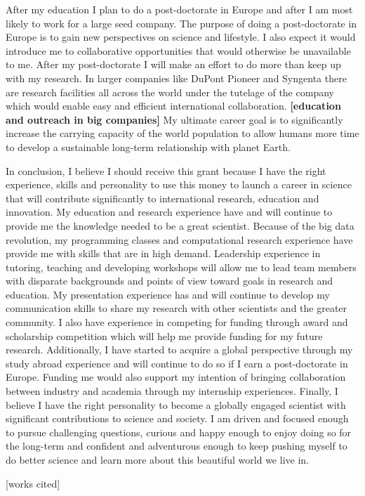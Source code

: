 \documentclass[12pt]{amsart}
\begin{document}
After my education I plan to do a post-doctorate in Europe and after I am most likely to work for a large seed company.
The purpose of doing a post-doctorate in Europe is to gain new perspectives on science and lifestyle.
I also expect it would introduce me to collaborative opportunities that would otherwise be unavailable to me.
After my post-doctorate I will make an effort to do more than keep up with my research.
In larger companies like DuPont Pioneer and Syngenta there are research facilities all across the world under the tutelage of the company which would enable easy and efficient international collaboration. \textbf{[education and outreach in big companies]}
My ultimate career goal is to significantly increase the carrying capacity of the world population to allow humans more time to develop a sustainable long-term relationship with planet Earth.

In conclusion, I believe I should receive this grant because I have the right experience, skills and personality to use this money to launch a career in science that will contribute significantly to international research, education and innovation.  
My education and research experience have and will continue to provide me the knowledge needed to be a great scientist.  
Because of the big data revolution, my programming classes and computational research experience have provide me with skills that are in high demand.
Leadership experience in tutoring, teaching and developing workshops will allow me to lead team members with disparate backgrounds and points of view toward goals in research and education.
My presentation experience has and will continue to develop my communication skills to share my research with other scientists and the greater community.
I also have experience in competing for funding through award and scholarship competition which will help me provide funding for my future research.  
Additionally, I have started to acquire a global perspective through my study abroad experience and will continue to do so if I earn a post-doctorate in Europe.  
Funding me would also support my intention of bringing collaboration between industry and academia through my internship experiences.
Finally, I believe I have the right personality to become a globally engaged scientist with significant contributions to science and society.  
I am driven and focused enough to pursue challenging questions, curious and happy enough to enjoy doing so for the long-term and confident and adventurous enough to keep pushing myself to do better science and learn more about this beautiful world we live in.

\small{
[works cited]
}
\end{document}
